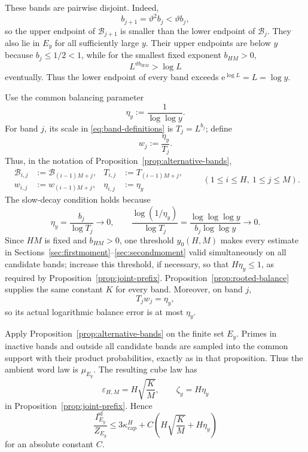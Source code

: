 \documentclass[11pt]{article}
\numberwithin{equation}{section}
\theoremstyle{plain}
\newcommand{\1}{\mathbf 1}
\newcommand{\e}{\mathrm e}
\newcommand{\eps}{\varepsilon}
\newcommand{\cB}{\mathcal B}
\newcommand{\kappacap}{\kappa_{\mathrm{cap}}}
\begin{document}
These bands are pairwise disjoint.  Indeed,
\[
 b_{j+1}=\vartheta^2b_j<\vartheta b_j,
\]
so the upper endpoint of $\cB_{j+1}$ is smaller than the lower endpoint of
$\cB_j$.  They also lie in $E_y$ for all sufficiently large $y$.  Their
upper endpoints are below $y$ because $b_j\le1/2<1$, while for the smallest
fixed exponent $b_{HM}>0$,
\[
 L^{\vartheta b_{HM}}>\log L
\]
eventually.  Thus the lower endpoint of every band exceeds
$\e^{\log L}=L=\log y$.

Use the common balancing parameter
\begin{equation}\label{eq:final-eta}
 \eta_y:=\frac1{\log\log y}.
\end{equation}
For band $j$, its scale in \eqref{eq:band-definitions} is
$T_j=L^{b_j}$; define
\begin{equation}\label{eq:placed-window-width}
 w_j:=\frac{\eta_y}{T_j}.
\end{equation}
Thus, in the notation of Proposition~\ref{prop:alternative-bands},
\begin{equation}\label{eq:placed-group-indexing}
 \begin{aligned}
  \cB_{i,j}&:=\cB_{(i-1)M+j},&
  T_{i,j}&:=T_{(i-1)M+j},\\
  w_{i,j}&:=w_{(i-1)M+j},&
  \eta_{i,j}&:=\eta_y
 \end{aligned}
 \qquad(1\le i\le H,\ 1\le j\le M).
\end{equation}
The slow-decay condition holds because
\[
 \eta_y=\frac{b_j}{\log T_j}\longrightarrow0,
 \qquad
 \frac{\log(1/\eta_y)}{\log T_j}
 =
 \frac{\log\log\log y}{b_j\log\log y}
 \longrightarrow0.
\]
Since $HM$ is fixed and $b_{HM}>0$, one threshold
$y_0(H,M)$ makes every estimate in
Sections~\ref{sec:firstmoment}--\ref{sec:secondmoment} valid simultaneously
on all candidate bands; increase this threshold, if necessary, so that
$H\eta_y\le1$, as required by Proposition~\ref{prop:joint-prefix}.
Proposition~\ref{prop:rooted-balance} supplies the
same constant $K$ for every band.  Moreover, on band $j$,
\[
 T_jw_j=\eta_y,
\]
so its actual logarithmic balance error is at most $\eta_y$.

Apply Proposition~\ref{prop:alternative-bands} on the finite set $E_y$.
Primes in inactive bands and outside all candidate bands are sampled into
the common support with their product probabilities, exactly as in that
proposition.  Thus the ambient word law is $\mu_{E_y}$.  The resulting cube
law has
\[
 \eps_{H,M}=H\sqrt{\frac KM},
 \qquad
 \zeta_y=H\eta_y
\]
in Proposition~\ref{prop:joint-prefix}.  Hence
\begin{equation}\label{eq:final-capacity-bound}
 \frac{I_{E_y}^{\mathrm{sf}}}{Z_{E_y}}
 \le
 3\kappacap^H+
 C\left(
 H\sqrt{\frac KM}+H\eta_y
 \right)
\end{equation}
for an absolute constant $C$.
\end{document}
